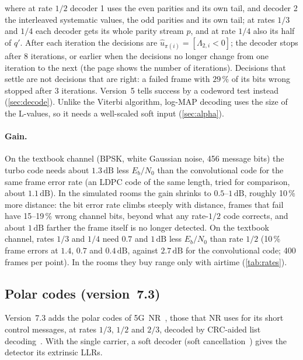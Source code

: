 \documentclass[11pt,a4paper]{article}
\newcommand{\dB}{\,\mathrm{dB}}
\theoremstyle{remark}
\begin{document}
where at rate $1/2$ decoder 1 uses the even parities and its own tail, and decoder 2 the interleaved systematic values, the odd parities and its own tail; at rates $1/3$ and $1/4$ each decoder gets its whole parity stream $p$, and at rate $1/4$ also its half of $q'$. After each iteration the decisions are $\hat u_{\pi(i)} = [\Lambda_{2,i} < 0]$; the decoder stops after 8 iterations, or earlier when the decisions no longer change from one iteration to the next (the page shows the number of iterations). Decisions that settle are not decisions that are right: a failed frame with $29\,\%$ of its bits wrong stopped after 3 iterations. Version~5 tells success by a codeword test instead (\cref{sec:decode}). Unlike the Viterbi algorithm, log-MAP decoding uses the size of the L-values, so it needs a well-scaled soft input (\cref{sec:alpha}).

\paragraph{Gain.}
On the textbook channel (BPSK, white Gaussian noise, 456 message bits) the turbo code needs about $1.3\dB$ less $E_b/N_0$ than the convolutional code for the same frame error rate (an LDPC code of the same length, tried for comparison, about $1.1\dB$). In the simulated rooms the gain shrinks to $0.5$--$1\dB$, roughly 10\,\% more distance: the bit error rate climbs steeply with distance, frames that fail have 15--19\,\% wrong channel bits, beyond what any rate-$1/2$ code corrects, and about $1\dB$ farther the frame itself is no longer detected.
On the textbook channel, rates $1/3$ and $1/4$ need $0.7$ and $1\dB$ less $E_b/N_0$ than rate $1/2$ (10\,\% frame errors at $1.4$, $0.7$ and $0.4\dB$, against $2.7\dB$ for the convolutional code; 400 frames per point). In the rooms they buy range only with airtime (\cref{tab:rates}).

\subsection{Polar codes (version~7.3)}
\label{sec:polar}
Version~7.3 adds the polar codes of 5G~NR~\cite{arikan,ts38212}, those that NR uses for its short control messages, at rates $1/3$, $1/2$ and $2/3$, decoded by CRC-aided list decoding~\cite{talvardy,niuchen}. With the single carrier, a soft decoder (soft cancellation~\cite{scan}) gives the detector its extrinsic LLRs.
\end{document}
